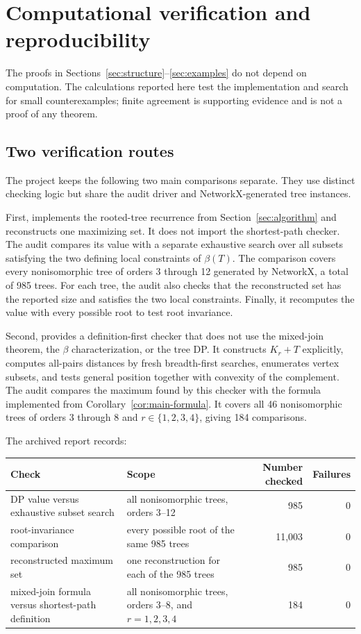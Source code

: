 \documentclass[11pt,a4paper]{article}
\providecommand{\Needspace}[1]{}
\numberwithin{equation}{section}
\begin{document}
\section{Computational verification and reproducibility}\label{sec:computation}

The proofs in Sections~\ref{sec:structure}--\ref{sec:examples} do not depend on computation. The
calculations reported here test the implementation and search for small
counterexamples; finite agreement is supporting evidence and is not a
proof of any theorem.

\subsection{Two verification routes}\label{sec:independent-checks}

The project keeps the following two main comparisons separate. They use
distinct checking logic but share the audit driver and NetworkX-generated
tree instances.

First,  implements the rooted-tree
recurrence from Section~\ref{sec:algorithm} and reconstructs one maximizing set. It does
not import the shortest-path checker. The audit compares its value with
a separate exhaustive search over all subsets satisfying the two
defining local constraints of \(\beta(T)\). The comparison covers every
nonisomorphic tree of orders 3 through 12 generated by NetworkX, a total
of 985 trees. For each tree, the audit also checks that the
reconstructed set has the reported size and satisfies the two local
constraints. Finally, it recomputes the value with every possible root
to test root invariance.

Second,  provides a
definition-first checker that does not use the mixed-join theorem, the
\(\beta\) characterization, or the tree DP. It constructs \(K_r+T\)
explicitly, computes all-pairs distances by fresh breadth-first
searches, enumerates vertex subsets, and tests general position together
with convexity of the complement. The audit compares the maximum found
by this checker with the formula implemented from Corollary~\ref{cor:main-formula}. It
covers all 46 nonisomorphic trees of orders 3 through 8 and
\(r\in\{1,2,3,4\}\), giving 184 comparisons.

\Needspace{8\baselineskip}
The archived report 
records:

\begin{longtable}[]{@{}L{0.25\textwidth}L{0.40\textwidth}rr@{}}
\toprule
Check & Scope & Number checked & Failures \\
\midrule
\endhead
DP value versus exhaustive subset search & all nonisomorphic trees,
orders 3--12 & 985 & 0 \\
root-invariance comparison & every possible root of the same 985 trees &
11,003 & 0 \\
reconstructed maximum set & one reconstruction for each of the 985 trees
& 985 & 0 \\
mixed-join formula versus shortest-path definition & all nonisomorphic
trees, orders 3--8, and \(r=1,2,3,4\) & 184 & 0 \\
\bottomrule
\end{longtable}
\end{document}
